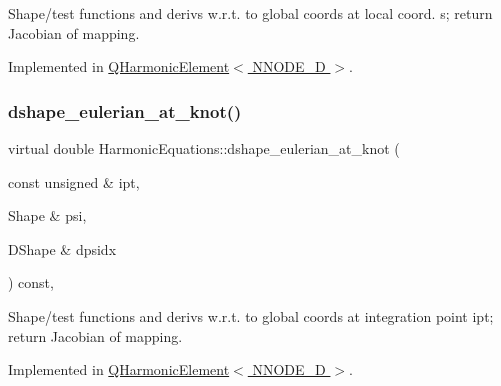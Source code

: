 Shape/test functions and derivs w.\+r.\+t. to global coords at local coord. s; return Jacobian of mapping. 



Implemented in \hyperlink{classQHarmonicElement_a206b7334e82cb563d7d575deb9f755b1}{Q\+Harmonic\+Element$<$ N\+N\+O\+D\+E\+\_\+D $>$}.

\mbox{\label{classHarmonicEquations_aaf04ba09dd948dcb0efb8e7e43da9736}} 
\subsubsection{\texorpdfstring{dshape\+\_\+eulerian\+\_\+at\+\_\+knot()}{dshape\_eulerian\_at\_knot()}}
{\footnotesize\ttfamily virtual double Harmonic\+Equations\+::dshape\+\_\+eulerian\+\_\+at\+\_\+knot (\begin{DoxyParamCaption}\item[{const unsigned \&}]{ipt,  }\item[{Shape \&}]{psi,  }\item[{D\+Shape \&}]{dpsidx }\end{DoxyParamCaption}) const\hspace{0.3cm}{\ttfamily [protected]}, {}}



Shape/test functions and derivs w.\+r.\+t. to global coords at integration point ipt; return Jacobian of mapping. 



Implemented in \hyperlink{classQHarmonicElement_a6b11b5a42bd20c4e1d1e9840ba22a80a}{Q\+Harmonic\+Element$<$ N\+N\+O\+D\+E\+\_\+D $>$}.

\mbox{\label{classHarmonicEquations_a0b756d9ac8dd9c7b9b7785c06f4fce77}} 
